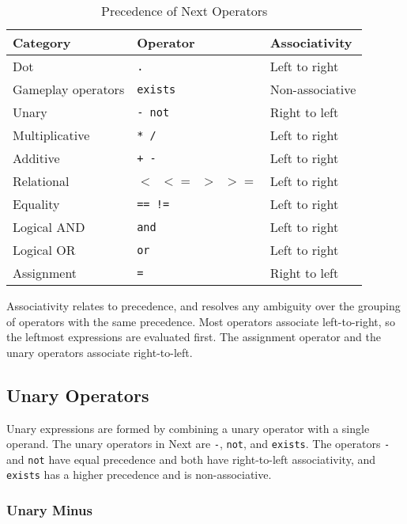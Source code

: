 \documentclass[12pt]{article}
\begin{document}
\begin{table}[htdp]
\caption{Precedence of Next Operators}
\begin{center}
\begin{tabular}{|l|l|l|}
\hline
\textbf{Category} & \textbf{Operator} & \textbf{Associativity} \\
\hline 
Dot & \texttt{.} & Left to right \\
\hline
Gameplay operators & \texttt{exists} & Non-associative \\
\hline
Unary & \texttt{- not} & Right to left \\
\hline
Multiplicative & \texttt{* /} & Left to right \\
\hline
Additive & \texttt{+ -} & Left to right \\
\hline
Relational & \texttt{$<$ $<=$ $>$ $>=$} & Left to right \\
\hline
Equality & \texttt{== !=} & Left to right \\
\hline
Logical AND & \texttt{and} & Left to right \\
\hline
Logical OR & \texttt{or} & Left to right \\
\hline
Assignment & \texttt{=} & Right to left \\
\hline
\end{tabular}
\end{center}
\label{precedence}
\end{table} 

\noindent Associativity relates to precedence, and resolves any ambiguity over the grouping of operators with the same precedence.  Most operators associate left-to-right, so the leftmost expressions are evaluated first.  The assignment operator  and the unary operators associate right-to-left.

\subsection{Unary Operators}
Unary expressions are formed by combining a unary operator with a single operand.  The unary operators in Next are \texttt{-}, \texttt{not}, and \texttt{exists}.  The operators \texttt{-} and \texttt{not} have equal precedence and both have right-to-left associativity, and \texttt{exists} has a higher precedence and is non-associative.

\subsubsection {Unary Minus}
\end{document}
